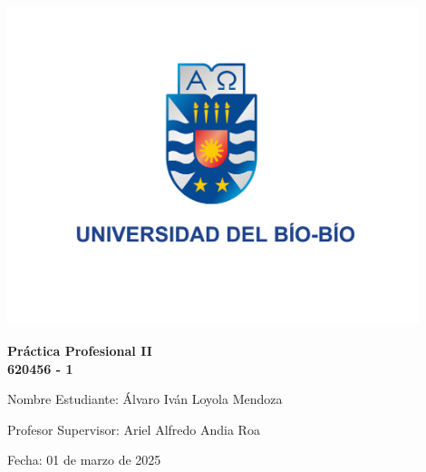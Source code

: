 \documentclass[12pt,a4paper]{report}
\begin{document}
\pagestyle{fancy}

\begin{titlepage}
    \thispagestyle{empty} %
    \centering
    \includegraphics[width=12cm]{images/logo-universidad.png}\par
    \vspace{1cm}
    {\huge\bfseries Práctica Profesional II\\[0.5em]620456 - 1\par}
    \vspace{1cm}
    {\Large Nombre Estudiante: Álvaro Iván Loyola Mendoza\par}
    {\Large Profesor Supervisor: Ariel Alfredo Andia Roa\par}
    {\Large Fecha: 01 de marzo de 2025\par}
    \vfill
\end{titlepage}
\setcounter{page}{2}



\tableofcontents
\newpage
\listoftables  %
\newpage
\listoffigures %
\newpage

\end{document}

